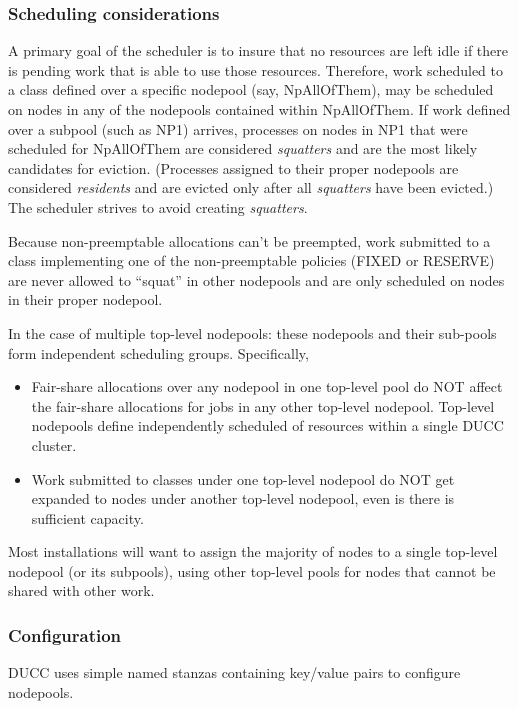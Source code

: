 \subsubsection{Scheduling considerations}
    A primary goal of the scheduler is to insure that no resources are left idle if there
    is pending work that is able to use those resources.  Therefore, work scheduled to
    a class defined over a specific nodepool (say, NpAllOfThem), may be scheduled on nodes
    in any of the nodepools contained within NpAllOfThem.  If work defined over a
    subpool (such as NP1) arrives, processes on nodes in NP1 that were scheduled for
    NpAllOfThem are considered {\em squatters} and are the most likely candidates for
    eviction. (Processes assigned to their proper nodepools are considered {\em residents}
    and are evicted only after all {\em squatters} have been evicted.)  The scheduler strives
    to avoid creating {\em squatters}.

    Because non-preemptable allocations can't be preempted, work submitted to a class
    implementing one of the non-preemptable policies (FIXED or RESERVE) are never allowed
    to ``squat'' in other nodepools and are only scheduled on nodes in their
    proper nodepool.

    In the case of multiple top-level nodepools: these nodepools and their sub-pools
    form independent scheduling groups.  Specifically,
    \begin{itemize}
        \item Fair-share allocations over any nodepool in one top-level pool do NOT affect the
          fair-share allocations for jobs in any other top-level nodepool.  Top-level nodepools
          define independently scheduled of resources within a single DUCC cluster.

        \item Work submitted to classes under one top-level nodepool do NOT get expanded to
          nodes under another top-level nodepool, even is there is sufficient capacity.
    \end{itemize}

    Most installations will want to assign the majority of nodes to a single top-level
    nodepool (or its subpools), using other top-level pools for nodes that cannot be
    shared with other work.

\subsubsection{Configuration}
\label{subsubsec:nodepool.configuration}
    DUCC uses simple named stanzas containing key/value pairs to configure nodepools.

